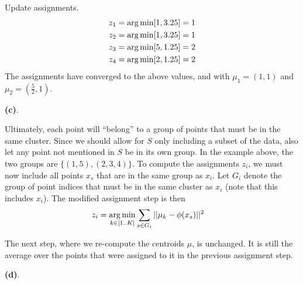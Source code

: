 \documentclass[11pt]{article}
\begin{document}
Update assignments. 
\begin{align}
z_1 &= \operatorname*{arg\,min} [ 1, 3.25 ]= 1 \\
z_2 &= \operatorname*{arg\,min} [ 1, 3.25 ] = 1 \\
z_3 &= \operatorname*{arg\,min} [ 5, 1.25 ] = 2 \\
z_4 &= \operatorname*{arg\,min} [ 2, 1.25 ] = 2
\end{align}
The assignments have converged to the above values, and with $\mu_1= \left( 1, 1 \right)$ and $\mu_2 = \left( \tfrac{5}{2}, 1 \right)$. 





\clearpage
\textbf{(c)}. 


Ultimately, each point will ``belong'' to a group of points that must be in the same cluster. Since we should allow for $S$ only including a subset of the data, also let any point not mentioned in $S$ be in its own group. In the example above, the two groups are $\{(1, 5), (2, 3, 4)\}$. To compute the assignments $z_i$, we must now include all points $x_s$ that are in the same group as $x_i$. Let $G_i$ denote the group of point indices that must be in the same cluster as $x_i$ (note that this includes $x_i$). The modified assignment step is then
\begin{align}
	z_i
		&= \operatorname*{arg\,min}_{k \in [1..K]} \sum_{s \in G_i} ||\mu_{k} - \phi(x_s) ||^2
\end{align}

The next step, where we re-compute the centroids $\mu$, is unchanged. It is still the average over the points that were assigned to it in the previous assignment step.


\clearpage
\textbf{(d)}. 
\end{document}
